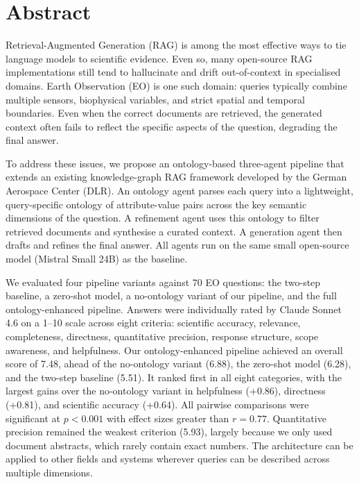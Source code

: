 \chapter*{Abstract}

Retrieval-Augmented Generation (RAG) is among the most effective ways to tie language models to scientific evidence. Even so, many open-source RAG implementations still tend to hallucinate and drift out-of-context in specialised domains. Earth Observation (EO) is one such domain: queries typically combine multiple sensors, biophysical variables, and strict spatial and temporal boundaries. Even when the correct documents are retrieved, the generated context often fails to reflect the specific aspects of the question, degrading the final answer.

To address these issues, we propose an ontology-based three-agent pipeline that extends an existing knowledge-graph RAG framework developed by the German Aerospace Center (DLR). An ontology agent parses each query into a lightweight, query-specific ontology of attribute-value pairs across the key semantic dimensions of the question. A refinement agent uses this ontology to filter retrieved documents and synthesise a curated context. A generation agent then drafts and refines the final answer. All agents run on the same small open-source model (Mistral Small 24B) as the baseline.

We evaluated four pipeline variants against 70 EO questions: the two-step baseline, a zero-shot model, a no-ontology variant of our pipeline, and the full ontology-enhanced pipeline. Answers were individually rated by Claude Sonnet 4.6 on a 1--10 scale across eight criteria: scientific accuracy, relevance, completeness, directness, quantitative precision, response structure, scope awareness, and helpfulness. Our ontology-enhanced pipeline achieved an overall score of 7.48, ahead of the no-ontology variant (6.88), the zero-shot model (6.28), and the two-step baseline (5.51). It ranked first in all eight categories, with the largest gains over the no-ontology variant in helpfulness (+0.86), directness (+0.81), and scientific accuracy (+0.64). All pairwise comparisons were significant at $p<0.001$ with effect sizes greater than $r=0.77$. Quantitative precision remained the weakest criterion (5.93), largely because we only used document abstracts, which rarely contain exact numbers. The architecture can be applied to other fields and systems wherever queries can be described across multiple dimensions.
